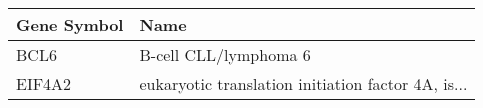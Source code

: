 \begin{tabular}{ll}
\toprule
Gene Symbol &                                               Name \\
\midrule
       BCL6 &                              B-cell CLL/lymphoma 6 \\
     EIF4A2 & eukaryotic translation initiation factor 4A, is... \\
\bottomrule
\end{tabular}

